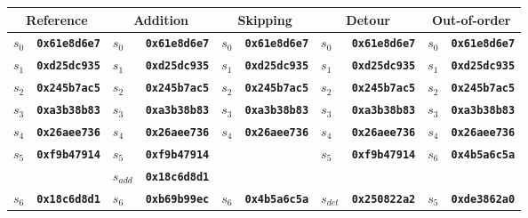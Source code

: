 \begin{table}
    \newcommand{\red}[1]{\color{red}\texttt{\textbf{#1}}}
    \newcommand{\blu}[1]{\color{blue}\texttt{\textbf{#1}}}
    \newcommand{\grn}[1]{\color{Green}\texttt{\textbf{#1}}}
    \newcommand{\skp}{\cellcolor{black!30}}
    \newcommand{\headersize}{\small}
    \centering
    \scriptsize
    \begin{tabularx}{\linewidth}{ll|ll|ll|ll|ll}
        \hline
        \multicolumn{2}{c|}{\headersize Reference} & \multicolumn{2}{c|}{\headersize Addition} & \multicolumn{2}{c|}{\headersize Skipping} & \multicolumn{2}{c|}{\headersize Detour} & \multicolumn{2}{c}{\headersize Out-of-order} \\
         \hline%
         \blu{$s_0$}   &\blu{0x61e8d6e7}&\grn{$s_0$}    &\grn{0x61e8d6e7}&\grn{$s_0$}   &\grn{0x61e8d6e7}&\grn{$s_0$}    &\grn{0x61e8d6e7}&\grn{$s_0$}    &\grn{0x61e8d6e7} \\ \hline
         \blu{$s_1$}   &\blu{0xd25dc935}&\grn{$s_1$}    &\grn{0xd25dc935}&\grn{$s_1$}   &\grn{0xd25dc935}&\grn{$s_1$}    &\grn{0xd25dc935}&\grn{$s_1$}    &\grn{0xd25dc935} \\ \hline
         \blu{$s_2$}   &\blu{0x245b7ac5}&\grn{$s_2$}    &\grn{0x245b7ac5}&\grn{$s_2$}   &\grn{0x245b7ac5}&\grn{$s_2$}    &\grn{0x245b7ac5}&\grn{$s_2$}    &\grn{0x245b7ac5} \\ \hline
         \blu{$s_3$}   &\blu{0xa3b38b83}&\grn{$s_3$}    &\grn{0xa3b38b83}&\grn{$s_3$}   &\grn{0xa3b38b83}&\grn{$s_3$}    &\grn{0xa3b38b83}&\grn{$s_3$}    &\grn{0xa3b38b83} \\ \hline
         \blu{$s_4$}   &\blu{0x26aee736}&\grn{$s_4$}    &\grn{0x26aee736}&\grn{$s_4$}   &\grn{0x26aee736}&\grn{$s_4$}    &\grn{0x26aee736}&\grn{$s_4$}    &\grn{0x26aee736} \\ \hline
         \blu{$s_5$}   &\blu{0xf9b47914}&\grn{$s_5$}    &\grn{0xf9b47914}&            &                  &\grn{$s_5$}    &\grn{0xf9b47914}&\red{$s_6$}    &\red{0x4b5a6c5a} \\ \hline
         \skp        &\skp              &\red{$s_{add}$}&\red{0x18c6d8d1}&\skp        &\skp              &\skp         &\skp              & \skp        &\skp               \\ \hline
         \blu{$s_6$}   &\blu{0x18c6d8d1}&\red{$s_6$}    &\red{0xb69b99ec}&\red{$s_6$}   &\red{0x4b5a6c5a}&\red{$s_{det}$}&\red{0x250822a2}&\red{$s_5$}    &\red{0xde3862a0} \\ \hline

\end{tabularx}
\end{table}
